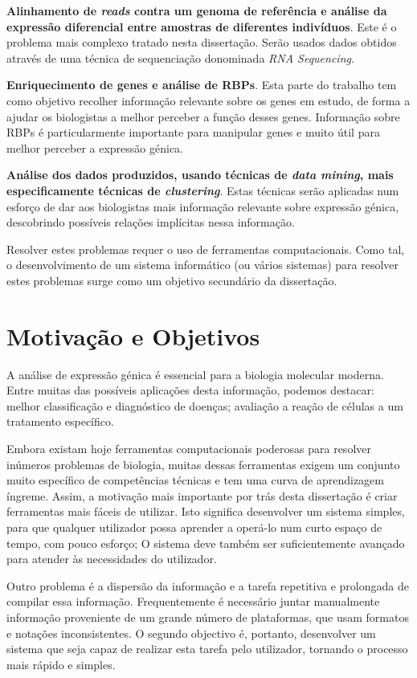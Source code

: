 \documentclass[9pt,a4paper]{extarticle}
\begin{document}
\begin{multicols}{2}
  \textbf{Alinhamento de \emph{reads} contra um genoma de referência e análise
  da expressão diferencial entre amostras de diferentes indivíduos}. Este é o
  problema mais complexo tratado nesta dissertação. Serão usados dados obtidos
  através de uma técnica de sequenciação donominada \emph{RNA
  Sequencing}.

  \textbf{Enriquecimento de genes e análise de RBPs}. Esta parte do trabalho
  tem como objetivo recolher informação relevante sobre os genes em estudo, de
  forma a ajudar os biologistas a melhor perceber a função desses genes.
  Informação sobre RBPs é particularmente importante para manipular genes e
  muito útil para melhor perceber a expressão génica.

  \textbf{Análise dos dados produzidos, usando técnicas de \emph{data mining},
  mais especificamente técnicas de \emph{clustering}}. Estas técnicas serão
  aplicadas num esforço de dar aos biologistas mais informação relevante sobre
  expressão génica, descobrindo possíveis relações implícitas nessa informação.

Resolver estes problemas requer o uso de ferramentas computacionais. Como tal,
o desenvolvimento de um sistema informático (ou vários sistemas) para resolver
estes problemas surge como um objetivo secundário da dissertação.

\section{Motivação e Objetivos} \label{sec:motivation}

A análise de expressão génica é essencial para a biologia molecular moderna.
Entre muitas das possíveis aplicações desta informação, podemos destacar:
melhor classificação e diagnóstico de doenças; avaliação a reação de células a
um tratamento específico.

Embora existam hoje ferramentas computacionais poderosas para resolver inúmeros
problemas de biologia, muitas dessas ferramentas exigem um conjunto muito
específico de competências técnicas e tem uma curva de aprendizagem íngreme.
Assim, a motivação mais importante por trás desta dissertação é criar
ferramentas mais fáceis de utilizar. Isto significa desenvolver um sistema
simples, para que qualquer utilizador possa aprender a operá-lo num curto espaço
de tempo, com pouco esforço; O sistema deve também ser suficientemente avançado
para atender às necessidades do utilizador.

Outro problema é a dispersão da informação e a tarefa repetitiva e prolongada de
compilar essa informação. Frequentemente é necessário juntar manualmente
informação proveniente de um grande número de plataformas, que usam formatos e
notações inconsistentes. O segundo objectivo é, portanto, desenvolver um sistema
que seja capaz de realizar esta tarefa pelo utilizador, tornando o processo mais
rápido e simples.


\end{multicols}
\end{document}
